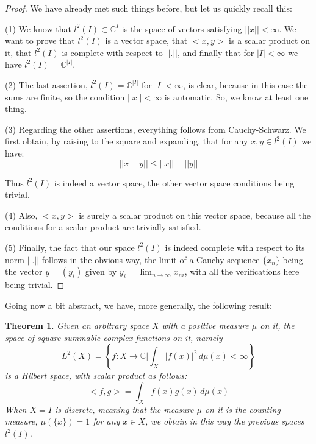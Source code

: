 \documentclass[12pt]{amsbook}
\newtheorem{theorem}{Theorem}[chapter]
\begin{document}
\begin{proof}
We have already met such things before, but let us quickly recall this:

\medskip

(1) We know that $l^2(I)\subset\mathbb C^I$ is the space of vectors satisfying $||x||<\infty$. We want to prove that $l^2(I)$ is a vector space, that $<x,y>$ is a scalar product on it, that $l^2(I)$ is complete with respect to $||.||$, and finally that for $|I|<\infty$ we have $l^2(I)=\mathbb C^{|I|}$.

\medskip

(2) The last assertion, $l^2(I)=\mathbb C^{|I|}$ for $|I|<\infty$, is clear, because in this case the sums are finite, so the condition $||x||<\infty$ is automatic. So, we know at least one thing.

\medskip

(3) Regarding the other assertions, everything follows from Cauchy-Schwarz. We first obtain, by raising to the square and expanding, that for any $x,y\in l^2(I)$ we have:
$$||x+y||\leq||x||+||y||$$

Thus $l^2(I)$ is indeed a vector space, the other vector space conditions being trivial.

\medskip

(4) Also, $<x,y>$ is surely a scalar product on this vector space, because all the conditions for a scalar product are trivially satisfied.

\medskip

(5) Finally, the fact that our space $l^2(I)$ is indeed complete with respect to its norm $||.||$ follows in the obvious way, the limit of a Cauchy sequence $\{x_n\}$ being the vector $y=(y_i)$ given by $y_i=\lim_{n\to\infty}x_{ni}$, with all the verifications here being trivial.
\end{proof}

Going now a bit abstract, we have, more generally, the following result:

\begin{theorem}
Given an arbitrary space $X$ with a positive measure $\mu$ on it, the space of square-summable complex functions on it, namely
$$L^2(X)=\left\{f:X\to\mathbb C\Big|\int_X|f(x)|^2\,d\mu(x)<\infty\right\}$$
is a Hilbert space, with scalar product as follows:
$$<f,g>=\int_Xf(x)\overline{g(x)}\,d\mu(x)$$
When $X=I$ is discrete, meaning that the measure $\mu$ on it is the counting measure, $\mu(\{x\})=1$ for any $x\in X$, we obtain in this way the previous spaces $l^2(I)$.
\end{theorem}
\end{document}

